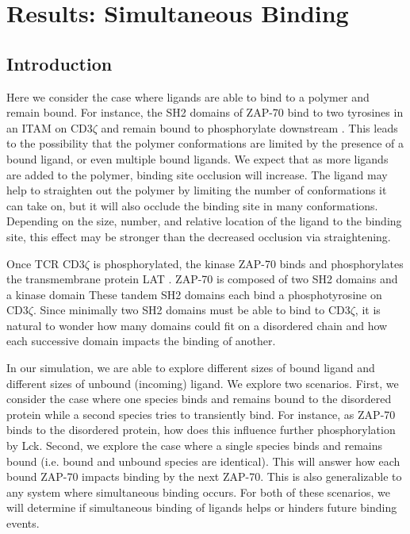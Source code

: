 \documentclass[../../AdvancementSummary.tex]{subfiles}
\begin{document}
\section{Results: Simultaneous Binding}
\label{sec: SimultaneousBinding}
\subsection{Introduction}

Here we consider the case where ligands are able to bind to a polymer and remain bound. For instance, the SH2 domains of ZAP-70 bind to two tyrosines in an ITAM on CD3$\zeta$ and remain bound to phosphorylate downstream \cite{Wang2010}. This leads to the possibility that the polymer conformations are limited by the presence of a bound ligand, or even multiple bound ligands. We expect that as more ligands are added to the polymer, binding site occlusion will increase. The ligand may help to straighten out the polymer by limiting the number of conformations it can take on, but it will also occlude the binding site in many conformations. Depending on the size, number, and relative location of the ligand to the binding site, this effect may be stronger than the decreased occlusion via straightening. 

Once TCR CD3$\zeta$ is phosphorylated, the kinase ZAP-70 binds and phosphorylates the transmembrane protein LAT \cite{Chan1992, Zhang1998}. ZAP-70 is composed of two SH2 domains and a kinase domain \cite{Chan1992, Wang2010} These tandem SH2 domains each bind a phosphotyrosine on CD3$\zeta$. Since minimally two SH2 domains must be able to bind to CD3$\zeta$, it is natural to wonder how many domains could fit on a disordered chain and how each successive domain impacts the binding of another. 

In our simulation, we are able to explore different sizes of bound ligand and different sizes of unbound (incoming) ligand. We explore two scenarios. First, we consider the case where one species binds and remains bound to the disordered protein while a second species tries to transiently bind. For instance, as ZAP-70 binds to the disordered protein, how does this influence further phosphorylation by Lck. Second, we explore the case where a single species binds and remains bound (i.e. bound and unbound species are identical). This will answer how each bound ZAP-70 impacts binding by the next ZAP-70. This is also generalizable to any system where simultaneous binding occurs. For both of these scenarios, we will determine if simultaneous binding of ligands helps or hinders future binding events. 
\end{document}
